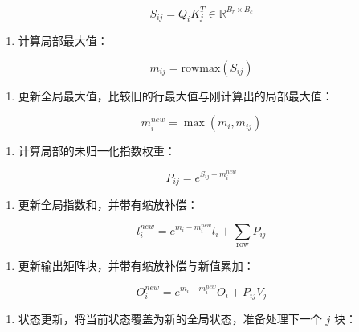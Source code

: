 \[
S_{ij} = Q_iK_j^T \in \mathbb{R}^{B_r \times B_c}
\]

\begin{enumerate}
\def\labelenumi{\arabic{enumi}.}
\setcounter{enumi}{2}
\tightlist
\item
{}
  计算局部最大值：
\end{enumerate}

\[
m_{ij} = \mathrm{rowmax}(S_{ij})
\]

\begin{enumerate}
\def\labelenumi{\arabic{enumi}.}
\setcounter{enumi}{3}
\tightlist
\item
{}
  更新全局最大值，比较旧的行最大值与刚计算出的局部最大值：
\end{enumerate}

\[
m_i^{new} = \max(m_i,m_{ij})
\]

\begin{enumerate}
\def\labelenumi{\arabic{enumi}.}
\setcounter{enumi}{4}
\tightlist
\item
{}
  计算局部的未归一化指数权重：
\end{enumerate}

\[
P_{ij} = e^{S_{ij}-m_i^{new}}
\]

\begin{enumerate}
\def\labelenumi{\arabic{enumi}.}
\setcounter{enumi}{5}
\tightlist
\item
{}
  更新全局指数和，并带有缩放补偿：
\end{enumerate}

\[
l_i^{new} = e^{m_i-m_i^{new}}l_i + \sum_{\text{row}} P_{ij}
\]

\begin{enumerate}
\def\labelenumi{\arabic{enumi}.}
\setcounter{enumi}{6}
\tightlist
\item
{}
  更新输出矩阵块，并带有缩放补偿与新值累加：
\end{enumerate}

\[
O_i^{new} = e^{m_i-m_i^{new}}O_i + P_{ij}V_j
\]

\begin{enumerate}
\def\labelenumi{\arabic{enumi}.}
\setcounter{enumi}{7}
\tightlist
\item
{}
  状态更新，将当前状态覆盖为新的全局状态，准备处理下一个 \(j\) 块：
\end{enumerate}

